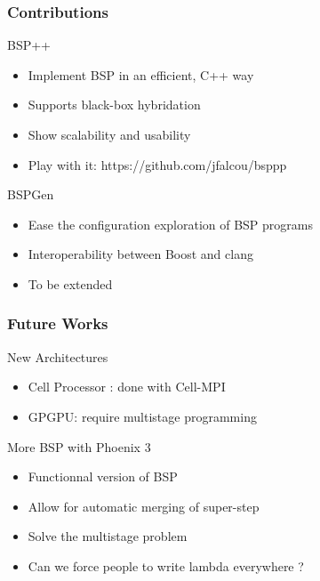 \frame
{
  \frametitle{Contributions}
  \begin{block}{BSP++}
  \begin{itemize}
  \footnotesize
  \item Implement BSP in an efficient, C++ way
  \item Supports black-box hybridation
  \item Show scalability and usability
  \item Play with it: https://github.com/jfalcou/bsppp
 \end{itemize}
  \end{block}{}

  \begin{block}{BSPGen}
  \begin{itemize}
  \footnotesize
  \item Ease the configuration exploration of BSP programs
  \item Interoperability between Boost and clang
  \item To be extended
 \end{itemize}
  \end{block}{}
}

\frame
{
  \frametitle{Future Works}
  \begin{block}{New Architectures}
  \begin{itemize}
  \footnotesize
  \item Cell Processor : done with Cell-MPI
  \item GPGPU: require multistage programming
 \end{itemize}
  \end{block}{}

  \begin{block}{More BSP with Phoenix 3}
  \begin{itemize}
  \footnotesize
   \item Functionnal version of BSP
   \item Allow for automatic merging of super-step
   \item Solve the multistage problem
   \item Can we force people to write lambda everywhere ? 
 \end{itemize}
  \end{block}{}
}
